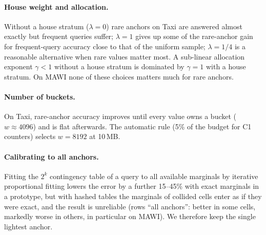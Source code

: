 \documentclass[sigconf,review,anonymous]{acmart}
\begin{document}
\paragraph{House weight and allocation.} Without a house stratum ($\lambda=0$) rare anchors on Taxi are
answered almost exactly but frequent queries suffer; $\lambda=1$ gives up some of the rare-anchor gain for
frequent-query accuracy close to that of the uniform sample; $\lambda=1/4$ is a reasonable alternative when
rare values matter most. A sub-linear allocation exponent $\gamma<1$ without a house stratum is dominated by
$\gamma=1$ with a house stratum. On MAWI none of these choices matters much for rare anchors.

\paragraph{Number of buckets.} On Taxi, rare-anchor accuracy improves until every value owns a bucket
($w\approx4096$) and is flat afterwards. The automatic rule (5\% of the budget for C1 counters) selects
$w=8192$ at 10\,MB.

\paragraph{Calibrating to all anchors.} Fitting the $2^k$ contingency table of a query to all available
marginals by iterative proportional fitting lowers the error by a further 15--45\% with exact marginals in a
prototype, but with hashed tables the marginals of collided cells enter as if they were exact, and the
result is unreliable (rows ``all anchors'': better in some cells, markedly worse in others, in particular
on MAWI). We therefore keep the single lightest anchor.
\end{document}
